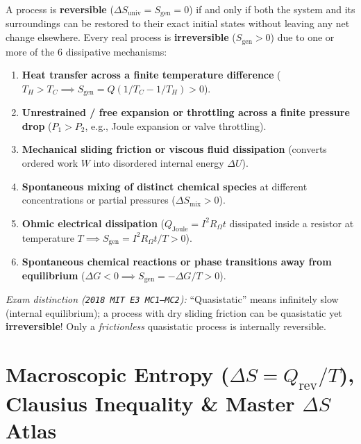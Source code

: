 \begin{formulacard}
A process is \textbf{reversible} ($\Delta S_{\mathrm{univ}} = S_{\mathrm{gen}} = 0$) if and only if both the system and its surroundings can be restored to their exact initial states without leaving any net change elsewhere. Every real process is \textbf{irreversible} ($S_{\mathrm{gen}} > 0$) due to one or more of the 6 dissipative mechanisms:
\begin{enumerate}
  \item \textbf{Heat transfer across a finite temperature difference} ($T_H > T_C \implies S_{\mathrm{gen}} = Q(1/T_C - 1/T_H) > 0$).
  \item \textbf{Unrestrained / free expansion or throttling across a finite pressure drop} ($P_1 > P_2$, e.g., Joule expansion or valve throttling).
  \item \textbf{Mechanical sliding friction or viscous fluid dissipation} (converts ordered work $W$ into disordered internal energy $\Delta U$).
  \item \textbf{Spontaneous mixing of distinct chemical species} at different concentrations or partial pressures ($\Delta S_{\mathrm{mix}} > 0$).
  \item \textbf{Ohmic electrical dissipation} ($Q_{\mathrm{Joule}} = I^2 R_\Omega t$ dissipated inside a resistor at temperature $T \implies S_{\mathrm{gen}} = I^2 R_\Omega t / T > 0$).
  \item \textbf{Spontaneous chemical reactions or phase transitions away from equilibrium} ($\Delta G < 0 \implies S_{\mathrm{gen}} = -\Delta G / T > 0$).
\end{enumerate}
\emph{Exam distinction (\texttt{2018 MIT E3 MC1--MC2}):} ``Quasistatic'' means infinitely slow (internal equilibrium); a process with dry sliding friction can be quasistatic yet \textbf{irreversible}! Only a \emph{frictionless} quasistatic process is internally reversible.
\end{formulacard}

\section{Macroscopic Entropy ($\Delta S = Q_{\mathrm{rev}}/T$), Clausius Inequality \& Master $\Delta S$ Atlas}\label{sec:08.2}

